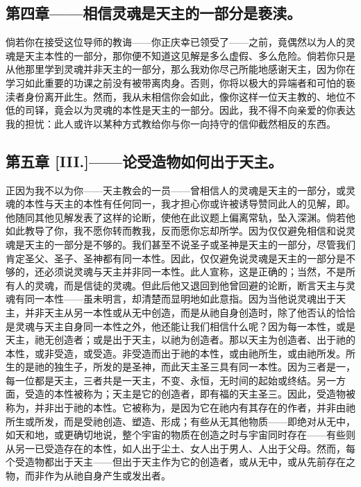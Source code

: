 \subsection{第四章——相信灵魂是天主的一部分是亵渎。}

倘若你在接受这位导师的教诲——你正庆幸已领受了——之前，竟偶然以为人的灵魂是天主本性的一部分，那你便不知道这见解是多么虚假、多么危险。倘若你只是从他那里学到灵魂并非天主的一部分，那么我劝你尽己所能地感谢天主，因为你在学习如此重要的功课之前没有被带离肉身。否则，你将以极大的异端者和可怕的亵渎者身份离开此生。然而，我从未相信你会如此，像你这样一位天主教的、地位不低的司铎，竟会以为灵魂的本性是天主的一部分。因此，我不得不向亲爱的你表达我的担忧：此人或许以某种方式教给你与你一向持守的信仰截然相反的东西。\par


\subsection{第五章 [III.]——论受造物如何出于天主。}

正因为我不以为你——天主教会的一员——曾相信人的灵魂是天主的一部分，或灵魂的本性与天主的本性有任何同一，我才担心你或许被诱导赞同此人的见解，即。他随同其他见解发表了这样的论断，使他在此议题上偏离常轨，坠入深渊。倘若他如此教导了你，我不愿你转而教我，反而愿你忘却所学。因为仅仅避免相信和说灵魂是天主的一部分是不够的。我们甚至不说圣子或圣神是天主的一部分，尽管我们肯定圣父、圣子、圣神都有同一本性。因此，仅仅避免说灵魂是天主的一部分是不够的，还必须说灵魂与天主并非同一本性。此人宣称，这是正确的；当然，不是所有人的灵魂，而是信徒的灵魂。但此后他又退回到他曾回避的论断，断言天主与灵魂有同一本性——虽未明言，却清楚而显明地如此意指。因为当他说灵魂出于天主，并非天主从另一本性或从无中创造，而是从祂自身创造时，除了他否认的恰恰是灵魂与天主自身同一本性之外，他还能让我们相信什么呢？因为每一本性，或是天主，祂无创造者；或是出于天主，以祂为创造者。那以天主为创造者、出于祂的本性，或非受造，或受造。非受造而出于祂的本性，或由祂所生，或由祂所发。所生的是祂的独生子，所发的是圣神，而此天主圣三具有同一本性。因为三者是一，每一位都是天主，三者共是一天主，不变、永恒，无时间的起始或终结。另一方面，受造的本性被称为；天主是它的创造者，即有福的天主圣三。因此，受造物被称为，并非出于祂的本性。它被称为，是因为它在祂内有其存在的作者，并非由祂所生或所发，而是受祂创造、塑造、形成；有些从无其他物质——即绝对从无中，如天和地，或更确切地说，整个宇宙的物质在创造之时与宇宙同时存在——有些则从另一已受造存在的本性，如人出于尘土、女人出于男人、人出于父母。然而，每个受造物都出于天主——但出于天主作为它的创造者，或从无中，或从先前存在之物，而非作为从祂自身产生或发出者。\par

